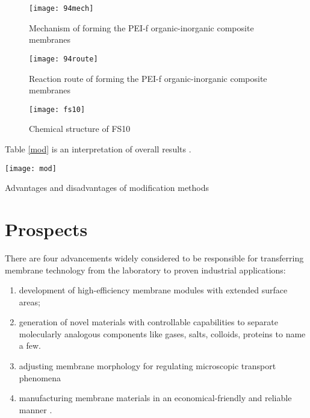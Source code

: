 \documentclass[a4paper,12pt]{report}
\begin{document}
\begin{figure}[h!]
\centering
  \texttt{[image: 94mech]}
  \caption{Mechanism of forming the PEI-f organic-inorganic composite membranes}
  \label{94mech}
\end{figure}

\begin{figure}[h!]
\centering
  \texttt{[image: 94route]}
  \caption{Reaction route of forming the PEI-f organic-inorganic composite membranes}
  \label{94route}
\end{figure}


\begin{figure}[h!]
\centering
  \texttt{[image: fs10]}
  \caption{Chemical structure of FS10}
  \label{fs10}
\end{figure}

Table \ref{mod} is an interpretation of overall results \citep{75cnad}.

\begin{table}[h!]  
  \texttt{[image: mod]}
  \caption{Advantages and disadvantages of modification methods}
  \label{mod}
\end{table}






\chapter{Prospects}

There are four advancements widely considered to be responsible for transferring membrane technology from the laboratory to proven industrial applications:
\begin{enumerate}

\item
development of high-efficiency membrane modules with extended surface areas;

\item
generation of novel materials with controllable capabilities to separate molecularly analogous components like gases, salts, colloids, proteins to name a few.

\item
adjusting membrane morphology for regulating microscopic transport phenomena

\item
manufacturing membrane materials in an economical-friendly and reliable manner \citep{kor04}.

\end{enumerate}
\end{document}
